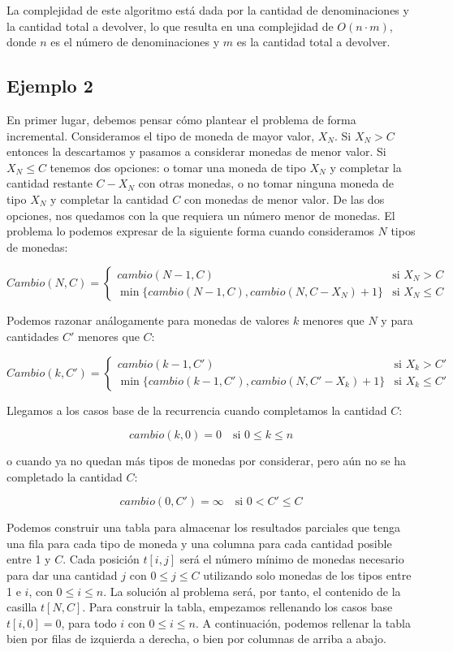 La complejidad de este algoritmo está dada por la cantidad de denominaciones y la cantidad total a devolver, lo que resulta en una complejidad de \(O(n \cdot m)\), donde \(n\) es el número de denominaciones y \(m\) es la cantidad total a devolver.

\subsection{Ejemplo 2}
En primer lugar, debemos pensar cómo plantear el problema de forma incremental. Consideramos el tipo de moneda de mayor valor, \(X_N\). Si \(X_N > C\) entonces la descartamos y pasamos a considerar monedas de menor valor. Si \(X_N \leq C\) tenemos dos opciones: o tomar una moneda de tipo \(X_N\) y completar la cantidad restante \(C - X_N\) con otras monedas, o no tomar ninguna moneda de tipo \(X_N\) y completar la cantidad \(C\) con monedas de menor valor. De las dos opciones, nos quedamos con la que requiera un número menor de monedas. El problema lo podemos expresar de la siguiente forma cuando consideramos \(N\) tipos de monedas:

\[
Cambio(N, C) = 
\begin{cases} 
cambio(N-1, C) & \text{si } X_N > C \\
\min\{cambio(N-1, C), cambio(N, C - X_N) + 1\} & \text{si } X_N \leq C 
\end{cases}
\]

Podemos razonar análogamente para monedas de valores \(k\) menores que \(N\) y para cantidades \(C'\) menores que \(C\):

\[
Cambio(k, C') = 
\begin{cases} 
cambio(k-1, C') & \text{si } X_k > C' \\
\min\{cambio(k-1, C'), cambio(N, C' - X_k) + 1\} & \text{si } X_k \leq C' 
\end{cases}
\]

Llegamos a los casos base de la recurrencia cuando completamos la cantidad \(C\):

\[
cambio(k, 0) = 0 \quad \text{si } 0 \leq k \leq n
\]

o cuando ya no quedan más tipos de monedas por considerar, pero aún no se ha completado la cantidad \(C\):

\[
cambio(0, C') = \infty \quad \text{si } 0 < C' \leq C
\]

Podemos construir una tabla para almacenar los resultados parciales que tenga una fila para cada tipo de moneda y una columna para cada cantidad posible entre 1 y \(C\). Cada posición \(t[i,j]\) será el número mínimo de monedas necesario para dar una cantidad \(j\) con \(0 \leq j \leq C\) utilizando solo monedas de los tipos entre 1 e \(i\), con \(0 \leq i \leq n\). La solución al problema será, por tanto, el contenido de la casilla \(t[N, C]\). Para construir la tabla, empezamos rellenando los casos base \(t[i, 0] = 0\), para todo \(i\) con \(0 \leq i \leq n\). A continuación, podemos rellenar la tabla bien por filas de izquierda a derecha, o bien por columnas de arriba a abajo.

